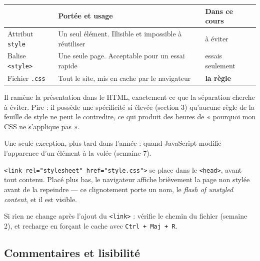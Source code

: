 \documentclass[a4paper,11pt]{article}
\newcommand{\hdr}[1]{\multicolumn{1}{l}{\color{white}\bfseries #1}}
\renewcommand{\arraystretch}{1.3}
\begin{document}
\begin{center}
\renewcommand{\arraystretch}{1.0}
\begin{tabularx}{\linewidth}{p{3cm}Xp{2.6cm}}
  \toprule
  \rowcolor{uniNavy}
  \hdr{Méthode} & \hdr{Portée et usage} & \hdr{Dans ce cours} \\
  \midrule
  \rowcolor{uniPaper}
  Attribut \texttt{style} & Un seul élément. Illisible et impossible à réutiliser & à éviter \\
  Balise \texttt{<style>} & Une seule page. Acceptable pour un essai rapide & essais seulement \\
  \rowcolor{uniPaper}
  Fichier \texttt{.css} & Tout le site, mis en cache par le navigateur & \textbf{la règle} \\
  \bottomrule
\end{tabularx}
\end{center}

\begin{tcolorbox}[interdit, title={L'attribut \texttt{style} est proscrit dans le MiniForum}]
Il ramène la présentation dans le HTML, exactement ce que la séparation cherche à éviter. Pire : il possède une spécificité si élevée (section 3) qu'aucune règle de la feuille de style ne peut le contredire, ce qui produit des heures de « pourquoi mon CSS ne s'applique pas ».

\vspace{3pt}
Une seule exception, plus tard dans l'année : quand JavaScript modifie l'apparence d'un élément à la volée (semaine 7).
\end{tcolorbox}

\begin{tcolorbox}[astuce, title={Le \texttt{<link>} va dans le \texttt{<head>}}]
\texttt{<link rel="stylesheet" href="style.css">} se place dans le \texttt{<head>}, avant tout contenu. Placé plus bas, le navigateur affiche brièvement la page non stylée avant de la repeindre --- ce clignotement porte un nom, le \textit{flash of unstyled content}, et il est visible.

\vspace{3pt}
Si rien ne change après l'ajout du \texttt{<link>} : vérifie le chemin du fichier (semaine 2), et recharge en forçant le cache avec \texttt{Ctrl + Maj + R}.
\end{tcolorbox}

\subsection{Commentaires et lisibilité}
\end{document}
